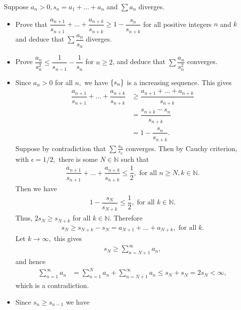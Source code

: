 \begin{problem}
Suppose $a_n>0,s_n=a_1+\ldots+a_n$ and $\sum a_n$ diverges.
\begin{itemize}
    \item[(a)]Prove that $\dfrac{a_{n+1}}{s_{n+1}}+\ldots+\dfrac{a_{n+k}}{s_{n+k}}\ge 1-\dfrac{s_n}{s_{n+k}}$ for all positive integers $n$ and $k$ and deduce that $\sum\dfrac{a_n}{s_n}$ diverges. 
    \item[(b)]Prove $\dfrac{a_n}{s_n^2}\le \dfrac{1}{s_{n-1}}-\dfrac{1}{s_n}$ for $n\ge 2$, and deduce that $\sum\dfrac{a_n}{s_n^2}$ converges.
\end{itemize}
\begin{solution}
\begin{itemize}
    \item[(a)]Since $a_n>0$ for all $n,$ we have $\left\{ s_n\right\}$ is a increasing sequence. This gives 
    \begin{align*}
        \dfrac{a_{n+1}}{s_{n+1}}+\ldots+\dfrac{a_{n+k}}{s_{n+k}}&\ge \dfrac{a_{n+1}+\ldots+a_{n+k}}{s_{n+k}}\\
        &=\dfrac{s_{n+k}-s_n}{s_{n+k}}\\
        &= 1-\dfrac{s_n}{s_{n+k}}.
    \end{align*}
    Suppose by contradiction that $\sum\frac{a_n}{s_n}$ converges. Then by Cauchy criterion, with $\epsilon=1/2,$ there is some $N\in\mathbb{N}$ such that 
\begin{align*}
     \dfrac{a_{n+1}}{s_{n+1}}+\ldots+\dfrac{a_{n+k}}{s_{n+k}}\le \dfrac{1}{2},\text{ for all }n\ge N,k\in\mathbb{N}.
\end{align*}
Then we have 
\begin{align*}
    1-\dfrac{s_N}{s_{N+k}}\le \dfrac{1}{2},\text{ for all }k\in\mathbb{N}.
\end{align*}
Thus, $2s_N\ge s_{N+k}$ for all $k\in\mathbb{N}.$ Therefore
\begin{align*}
    s_N\ge s_{N+k}-s_N=a_{N+1}+\ldots+a_{N+k},\text{ for all }k.
\end{align*}
Let $k\rightarrow \infty,$ this gives 
\begin{align*}
    s_N\ge \sum_{n=N+1}^\infty a_n,
\end{align*}
and hence 
\begin{align*}
    \sum_{n=1}^\infty a_n&=\sum_{n=1}^N a_n+\sum_{n=N+1}^\infty a_n\le s_N+s_N=2s_N<\infty,
\end{align*}
which is a contradiction.
\item[(b)] Since $s_n\ge s_{n-1}$ we have 
\begin{align*}

\end{align*}
\end{itemize}
\end{solution}
\end{problem}
